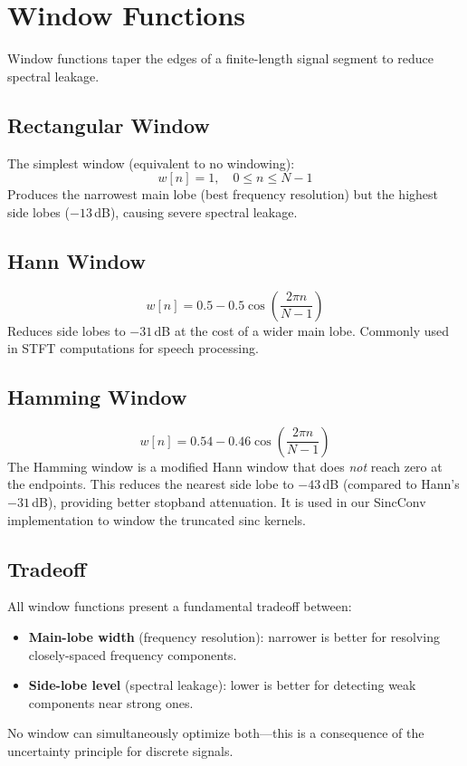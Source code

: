 \documentclass[12pt]{report}
\begin{document}
\section{Window Functions}

Window functions taper the edges of a finite-length signal segment to reduce spectral leakage.

\subsection{Rectangular Window}

The simplest window (equivalent to no windowing):
\begin{equation}
    w[n] = 1, \quad 0 \leq n \leq N-1
\end{equation}
Produces the narrowest main lobe (best frequency resolution) but the highest side lobes
($-13$\,dB), causing severe spectral leakage.

\subsection{Hann Window}

\begin{equation}
    w[n] = 0.5 - 0.5\cos\!\left(\frac{2\pi n}{N-1}\right)
\end{equation}
Reduces side lobes to $-31$\,dB at the cost of a wider main lobe. Commonly used in STFT
computations for speech processing.

\subsection{Hamming Window}

\begin{equation}
    w[n] = 0.54 - 0.46\cos\!\left(\frac{2\pi n}{N-1}\right)
\end{equation}
The Hamming window is a modified Hann window that does \emph{not} reach zero at the endpoints.
This reduces the nearest side lobe to $-43$\,dB (compared to Hann's $-31$\,dB), providing
better stopband attenuation. It is used in our SincConv implementation to window the
truncated sinc kernels.

\subsection{Tradeoff}

All window functions present a fundamental tradeoff between:
\begin{itemize}[noitemsep]
    \item \textbf{Main-lobe width} (frequency resolution): narrower is better for resolving
          closely-spaced frequency components.
    \item \textbf{Side-lobe level} (spectral leakage): lower is better for detecting weak
          components near strong ones.
\end{itemize}
No window can simultaneously optimize both---this is a consequence of the uncertainty principle
for discrete signals.
\end{document}
